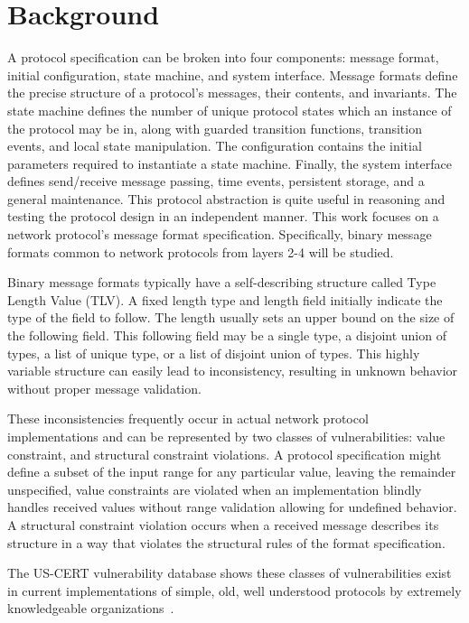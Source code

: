 \section{Background}
     
A protocol specification can be broken into four components: message format,
initial configuration, state machine, and system interface. Message formats
define the precise structure of a protocol's messages, their contents, and
invariants. The state machine defines the number of unique protocol states 
which an instance of the protocol may be in, along with guarded transition
functions, transition events, and local state manipulation. The configuration
contains the initial parameters required to instantiate a state machine.
Finally, the system interface defines send/receive message passing, time events,
persistent storage, and a general maintenance. This protocol abstraction is
quite useful in reasoning and testing the protocol design in an independent
manner. This work focuses on a network protocol's message format specification.
Specifically, binary message formats common to network protocols from layers 2-4
will be studied.

Binary message formats typically have a self-describing structure called Type
Length Value (TLV). A fixed length type and length field initially indicate the
type of the field to follow. The length usually sets an upper bound on the size
of the following field. This following field may be a single type, a disjoint
union of types, a list of unique type, or a list of disjoint union of types.
This highly variable structure can easily lead to inconsistency, resulting in
unknown behavior without proper message validation. 

These inconsistencies frequently occur in actual network protocol
implementations and can be represented by two classes of vulnerabilities:
value constraint, and structural constraint violations.
A protocol specification might define a subset of the input range for any
particular value, leaving the remainder unspecified, value constraints are
violated when an implementation blindly handles received values without range
validation allowing for undefined behavior. A structural constraint violation
occurs when a received message describes its structure in a way that violates
the structural rules of the format specification. 

The US-CERT vulnerability database
shows these classes of vulnerabilities exist in current implementations of
simple, old, well understood protocols by extremely knowledgeable organizations~\cite{us_cert}.

